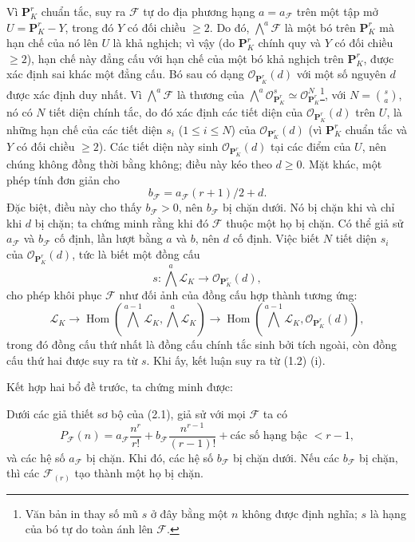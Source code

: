 Vì $\mathbf P^r_K$ chuẩn tắc, suy ra $\mathcal F$ tự do địa phương hạng
$a=a_{\mathcal F}$ trên một tập mở $U=\mathbf P^r_K-Y$, trong đó $Y$ có đối
chiều $\geq2$. Do đó, $\bigwedge^a\mathcal F$ là một bó trên
$\mathbf P^r_K$ mà hạn chế của nó lên $U$ là khả nghịch; vì vậy (do
$\mathbf P^r_K$ chính quy và $Y$ có đối chiều $\geq2$), hạn chế này đẳng cấu
với hạn chế của một bó khả nghịch trên $\mathbf P^r_K$, được xác định sai khác
một đẳng cấu. Bó sau có dạng $\mathcal O_{\mathbf P^r_K}(d)$ với một số nguyên
$d$ được xác định duy nhất. Vì $\bigwedge^a\mathcal F$ là thương của
$\bigwedge^a\mathcal O_{\mathbf P^r_K}^{s}\simeq
\mathcal O_{\mathbf P^r_K}^{N}$\footnote{Văn bản in thay số mũ $s$ ở đây bằng
một $n$ không được định nghĩa; $s$ là hạng của bó tự do toàn ánh lên
$\mathcal F$.}, với $N=\binom{s}{a}$, nó có $N$ tiết diện chính tắc, do đó xác
định các tiết diện của
$\mathcal O_{\mathbf P^r_K}(d)$ trên $U$, là những hạn chế của các tiết diện
$s_i$ ($1\leq i\leq N$) của $\mathcal O_{\mathbf P^r_K}(d)$ (vì
$\mathbf P^r_K$ chuẩn tắc và $Y$ có đối chiều $\geq2$). Các tiết diện này sinh
$\mathcal O_{\mathbf P^r_K}(d)$ tại các điểm của $U$, nên chúng không đồng thời
bằng không; điều này kéo theo $d\geq0$. Mặt khác, một phép tính đơn giản cho
\[
b_{\mathcal F}=a_{\mathcal F}(r+1)/2+d.
\]
Đặc biệt, điều này cho thấy $b_{\mathcal F}>0$, nên $b_{\mathcal F}$ bị chặn
dưới. Nó bị chặn khi và chỉ khi $d$ bị chặn; ta chứng minh rằng khi đó
$\mathcal F$ thuộc một họ bị chặn. Có thể giả sử $a_{\mathcal F}$ và
$b_{\mathcal F}$ cố định, lần lượt bằng $a$ và $b$, nên $d$ cố định. Việc biết
$N$ tiết diện $s_i$ của $\mathcal O_{\mathbf P^r_K}(d)$, tức là biết một đồng
cấu
\[
s:\bigwedge^a\mathcal L_K\longrightarrow\mathcal O_{\mathbf P^r_K}(d),
\]
cho phép khôi phục $\mathcal F$ như đối ảnh của đồng cấu hợp thành tương ứng:
\[
\mathcal L_K\longrightarrow
\operatorname{Hom}\!\left(\bigwedge^{a-1}\mathcal L_K,
\bigwedge^a\mathcal L_K\right)\longrightarrow
\operatorname{Hom}\!\left(\bigwedge^{a-1}\mathcal L_K,
\mathcal O_{\mathbf P^r_K}(d)\right),
\]
trong đó đồng cấu thứ nhất là đồng cấu chính tắc sinh bởi tích ngoài, còn đồng
cấu thứ hai được suy ra từ $s$. Khi ấy, kết luận suy ra từ (1.2) (i).

Kết hợp hai bổ đề trước, ta chứng minh được:

 Dưới các giả thiết sơ bộ của (2.1), giả sử với mọi
$\mathcal F$ ta có
\[
P_{\mathcal F}(n)=a_{\mathcal F}\frac{n^r}{r!}
+b_{\mathcal F}\frac{n^{r-1}}{(r-1)!}
+\text{các số hạng bậc $<r-1$},
\]
và các hệ số $a_{\mathcal F}$ bị chặn. Khi đó, các hệ số $b_{\mathcal F}$ bị
chặn dưới. Nếu các $b_{\mathcal F}$ bị chặn, thì các $\mathcal F_{(r)}$ tạo
thành một họ bị chặn.

